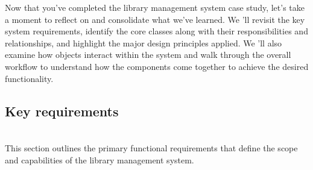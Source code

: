 

Now that you've completed the library management system case study, let's take a moment to reflect on and consolidate what we've learned. We 'll revisit the key system requirements, identify the core classes along with their responsibilities and relationships, and highlight the major design principles applied. We
'll also examine how objects interact within the system and walk through the overall workflow to understand how the components come together to achieve the desired functionality.

\subsection{Key requirements}\label{y6Ec3wVEecpm2HabgXzoK}
\\
This section outlines the primary functional requirements that define the scope and capabilities of the library management system.

